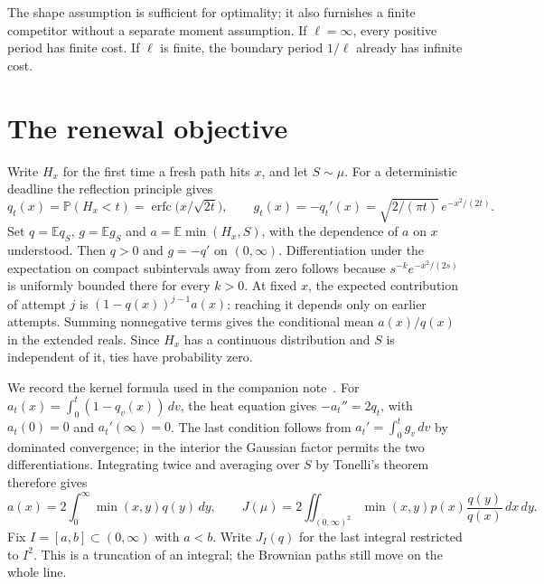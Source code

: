 \documentclass[11pt]{article}
\newcommand{\E}{\mathbb E}
\newcommand{\Prob}{\mathbb P}
\newcommand{\erfc}{\operatorname{erfc}}
\begin{document}
The shape assumption is sufficient for optimality; it also furnishes a
finite competitor without a separate moment assumption. If $\ell=\infty$,
every positive period has finite cost. If $\ell$ is finite, the boundary
period $1/\ell$ already has infinite cost.

\section{The renewal objective}
Write $H_x$ for the first time a fresh path hits $x$, and let $S\sim\mu$.
For a deterministic deadline the reflection principle gives
\[
 q_t(x)=\Prob(H_x<t)=\erfc\!\bigl(x/\sqrt{2t}\bigr),\qquad
 g_t(x)=-q_t'(x)=\sqrt{2/(\pi t)}\,e^{-x^2/(2t)} .
\]
Set $q=\E q_S$, $g=\E g_S$ and $a=\E\min(H_x,S)$, with the dependence of
$a$ on $x$ understood. Then $q>0$ and $g=-q'$ on $(0,\infty)$.
Differentiation under the expectation on compact subintervals away from zero
follows because $s^{-k} e^{-x^2/(2s)}$ is uniformly bounded there for
every $k>0$. At fixed $x$, the expected contribution of attempt $j$ is
$(1-q(x))^{j-1}a(x)$: reaching it depends only on earlier attempts.
Summing nonnegative terms gives the conditional mean $a(x)/q(x)$ in
the extended reals. Since $H_x$ has a continuous distribution and $S$
is independent of it, ties have probability zero.

We record the kernel formula used in the companion note~\cite{note}.
For $a_t(x)=\int_0^t(1-q_v(x))\,dv$, the heat equation gives
$-a_t''=2q_t$, with $a_t(0)=0$ and $a_t'(\infty)=0$. The last condition
follows from $a_t'=\int_0^t g_v\,dv$ by dominated convergence; in the
interior the Gaussian factor permits the two differentiations.
Integrating twice and averaging over $S$ by Tonelli's theorem therefore gives
\begin{equation}\label{eq:J}
 a(x)=2\int_0^\infty\min(x,y)q(y)\,dy,\qquad
 J(\mu)=2\iint_{(0,\infty)^2}\min(x,y)p(x)\frac{q(y)}{q(x)}\,dx\,dy .
\end{equation}
Fix $I=[a,b]\subset(0,\infty)$ with $a<b$. Write $J_I(q)$ for the last
integral restricted to $I^2$. This is a truncation of an integral; the
Brownian paths still move on the whole line.
\end{document}
